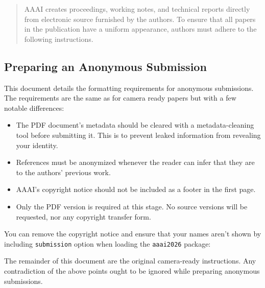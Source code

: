 
\maketitle
\begin{abstract}
AAAI creates proceedings, working notes, and technical reports directly
from electronic source furnished by the authors. To ensure that all
papers in the publication have a uniform appearance, authors must adhere
to the following instructions.
\end{abstract}
\subsection{Preparing an Anonymous
Submission}\label{preparing-an-anonymous-submission}

This document details the formatting requirements for anonymous
submissions. The requirements are the same as for camera ready papers
but with a few notable differences:

\begin{itemize}
\tightlist
\item
  The PDF document's metadata should be cleared with a metadata-cleaning
  tool before submitting it. This is to prevent leaked information from
  revealing your identity.
\item
  References must be anonymized whenever the reader can infer that they
  are to the authors' previous work.
\item
  AAAI's copyright notice should not be included as a footer in the
  first page.
\item
  Only the PDF version is required at this stage. No source versions
  will be requested, nor any copyright transfer form.
\end{itemize}

You can remove the copyright notice and ensure that your names aren't
shown by including \texttt{submission} option when loading the
\texttt{aaai2026} package:

\begin{Shaded}
\begin{Highlighting}[]
\NormalTok{[letterpaper]\{}\NormalTok{\}}
\NormalTok{[submission]\{}\NormalTok{\}}
\end{Highlighting}
\end{Shaded}

The remainder of this document are the original camera-ready
instructions. Any contradiction of the above points ought to be ignored
while preparing anonymous submissions.

